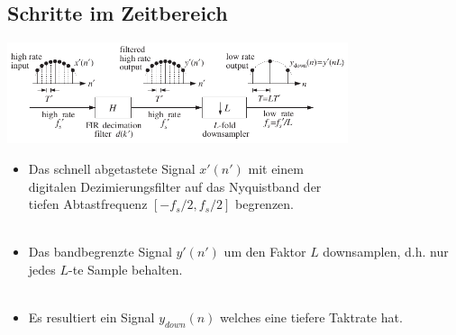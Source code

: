 	\subsection{Schritte im Zeitbereich}
		\hspace*{1cm}\includegraphics[width = 0.75\textwidth]{pic/dicimation.pdf}
		\begin{itemize}
		  \item Das schnell abgetastete Signal $x'(n')$ mit einem\\ digitalen Dezimierungsfilter auf das Nyquistband der\\ tiefen Abtastfrequenz $[-f_s/2,f_s/2]$ begrenzen.\\[-1.35cm]
		  \hspace*{10.2cm}\\[-0.1cm]
		  \item Das bandbegrenzte Signal $y'(n')$ um den Faktor $L$ downsamplen, d.h. nur jedes $L$-te Sample behalten.\\[0.2cm]
		  \\[-0.45cm]
		  \item Es resultiert ein Signal $y_{down}(n)$ welches eine tiefere Taktrate hat.$\qquad$
		  \\[-0.4cm]
		\end{itemize}
		
